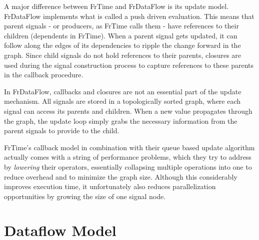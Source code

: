 A major difference between FrTime and FrDataFlow is its update model. FrDataFlow implements what is called a push driven evaluation. This means that parent signals - or producers, as FrTime calls them - have references to their children (dependents in FrTime). When a parent signal gets updated, it can follow along the edges of its dependencies to ripple the change forward in the graph. Since child signals do not hold references to their parents, closures are used during the signal construction process to capture references to these parents in the callback procedure.

In FrDataFlow, callbacks and closures are not an essential part of the update mechanism. All signals are stored in a topologically sorted graph, where each signal can access its parents and children. When a new value propagates through the graph, the update loop simply grabs the necessary information from the parent signals to provide to the child.

FrTime's callback model in combination with their queue based update algorithm actually comes with a string of performance problems, which they try to address by \textit{lowering} \cite{burchett_lowering:_2007} their operators, essentially collapsing multiple operations into one to reduce overhead and to minimize the graph size. Although this considerably improves execution time, it unfortunately also reduces parallelization opportunities by growing the size of one signal node. 


\section{Dataflow Model}



